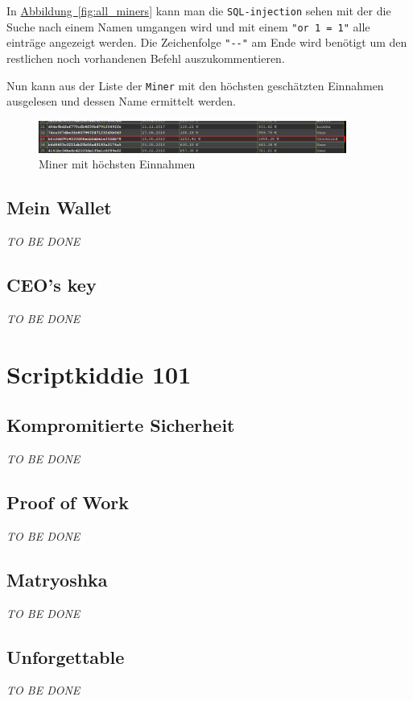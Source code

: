 \documentclass[12pt,a4paper,titlepage,oneside]{scrartcl}
\begin{document}
In \hyperref[fig:all_miners]{Abbildung~\ref*{fig:all_miners}} kann man die \lstinline{SQL-injection} sehen mit der die Suche nach einem Namen umgangen wird und mit einem \lstinline{"or 1 = 1"} alle einträge angezeigt werden. Die Zeichenfolge \lstinline{"--"} am Ende wird benötigt um den restlichen noch vorhandenen Befehl auszukommentieren.

Nun kann aus der Liste der \lstinline{Miner} mit den höchsten geschätzten Einnahmen ausgelesen und dessen Name ermittelt werden.

\begin{figure}[h!]
  \centering
  \includegraphics[width=0.9\textwidth]{./imgs/manager9000/highest_miner.png}
\caption{Miner mit höchsten Einnahmen}
\label{fig:highest_miner}
\end{figure}

\subsection{Mein Wallet}
\emph{TO BE DONE}

\subsection{CEO's key}
\emph{TO BE DONE}

\section{Scriptkiddie 101}

\subsection{Kompromitierte Sicherheit}
\emph{TO BE DONE}

\subsection{Proof of Work}
\emph{TO BE DONE}

\subsection{Matryoshka}
\emph{TO BE DONE}

\subsection{Unforgettable}
\emph{TO BE DONE}
\end{document}
